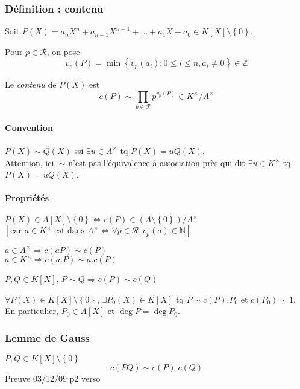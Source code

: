 \documentclass[reqno,a4paper,10pt]{report}
\makeatletter
\newcommand{\set}[1]{\left\lbrace #1 \right\rbrace} %
\newcommand{\IZ}{\ensuremath{\mathbb{Z}}\xspace} %
\newcommand{\IN}{\ensuremath{\mathbb{N}}\xspace} %
\newcommand{\so}{\Rightarrow}
\let\oldenumerate=\enumerate%
\renewenvironment{enumerate}{%
    \oldenumerate%
  }{%
    \@noparlisttrue%
    \endlist%
  }%
\makeatother
\begin{document}
\subsubsection{Définition : contenu}
Soit $P(X)=a_n X^n +a_{n-1} X^{n-1} + \dots + a_1 X + a_0 \in
K[X]\setminus\set{0}$.

Pour $p\in \mathcal R$, on pose
\[v_p(P)=\min \set{v_p(a_i); 0 \leq i \leq n, a_i \neq 0} \in \IZ\]

Le \emph{contenu} de $P(X)$ est
\[c(P) \sim \prod_{p\in \mathcal R} p^{v_p(P)} \in K^\times/A^\times\]

\paragraph{Convention} $P(X) \sim Q(X)$ ssi $\exists u \in A^\times$ tq
$P(X)=uQ(X)$.\\
Attention, ici, $\sim$ n'est pas l'équivalence à association près qui dit
$\exists u \in K^\times$ tq $P(X)=uQ(X)$.

\paragraph{Propriétés}
\begin{enumerate}
  \item $P(X) \in A[X]\setminus\set{0} \iff c(P)\in \left(
    A\setminus\set{0} \right)/A^\times$\\
    $\left[ \text{car } a\in K^\times \text{ est dans } A^\times \iff \forall p
    \in \mathcal R, v_p(a) \in \IN\right]$
  \item $a\in A^\times \so c(aP) \sim c(P)$\\
    $a\in K^\times \so c(a.P) \sim a.c(P)$
  \item $P,Q \in K[X]$, $P\sim Q \so c(P)\sim c(Q)$
  \item $\forall P(X) \in K[X]\setminus\set{0}$, $\exists P_0(X) \in K[X]$ tq
    $P \sim c(P).P_0$ et $c(P_0) \sim 1$.\\
    En particulier, $P_0 \in A[X]$ et $\deg P=\deg P_0$.
\end{enumerate}

\subsubsection{Lemme de Gauss}
$P,Q \in K[X]\setminus\set{0}$
\[c(PQ)\sim c(P).c(Q)\]
  Preuve 03/12/09 p2 verso
\end{document}
